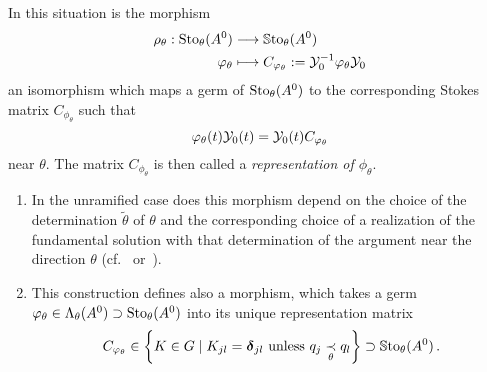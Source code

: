 \begin{prop}\label{prop:representation}
  In this situation is the morphism
  \begin{align*}
    \rho_{\theta}:\operatorname{Sto}_\theta(A^0)&\longrightarrow\operatorname{\mathbb{S}to}_\theta(A^0)
    \\\varphi_\theta
    &\longmapsto
    C_{\varphi_\theta}:=\mathcal{Y}_{0}^{-1}\varphi_\theta\mathcal{Y}_{0}
  \end{align*}
  an isomorphism which maps a germ of $\operatorname{Sto}_\theta(A^0)$ to the corresponding
  Stokes matrix $C_{\phi_\theta}$ such that
  \begin{equation} \label{eq:representation}
    \varphi_\theta(t)\mathcal{Y}_{0}(t)
    =\mathcal{Y}_{0}(t)C_{\varphi_\theta}
  \end{equation}
  near $\theta$.
  The matrix $C_{\phi_\theta}$ is then called a \emph{representation of
  $\phi_\theta$}.
  \begin{s-rem}
    \begin{enumerate}
      \item In the unramified case does this morphism depend on the choice of
        the determination $\tilde\theta$ of $\theta$ and the corresponding
        choice of a realization of the fundamental solution with that
        determination of the argument near the direction $\theta$
        (cf.~\cite{Loday1994} or~\cite[78f]{Loday2014}).
      \item {}
        This construction defines also a morphism, which takes a germ
        $\varphi_\theta\in\Lambda_\theta(A^0)\supset\operatorname{Sto}_\theta(A^0)$ into its
        unique representation matrix
        \[
          C_{\varphi_\theta}
          \in\left\{K\in G\mid K_{jl}=\boldsymbol{\delta}_{jl} \text{ unless }
          q_j \underset{\theta}{\prec} q_l \right\}
          \supset\operatorname{\mathbb{S}to}_\theta(A^0) \,.
        \]
    \end{enumerate}
  \end{s-rem}
\end{prop}
